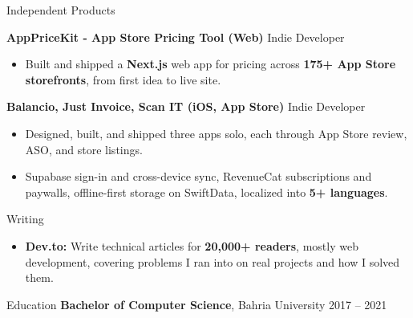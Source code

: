 \documentclass{resume}
\begin{document}
\begin{rSection}{Independent Products}

\textbf{AppPriceKit - App Store Pricing Tool (Web)} \hfill Indie Developer
\begin{itemize}
\itemsep 1pt {}
\item Built and shipped a \textbf{Next.js} web app for pricing across \textbf{175+ App Store storefronts}, from first idea to live site.
\end{itemize}

\textbf{Balancio, Just Invoice, Scan IT (iOS, App Store)} \hfill Indie Developer
\begin{itemize}
\itemsep 1pt {}
\item Designed, built, and shipped three apps solo, each through App Store review, ASO, and store listings.
\item Supabase sign-in and cross-device sync, RevenueCat subscriptions and paywalls, offline-first storage on SwiftData, localized into \textbf{5+ languages}.
\end{itemize}

\end{rSection}

\begin{rSection}{Writing}
\begin{itemize}
\itemsep 1pt {}
\item \textbf{Dev.to:} Write technical articles for \textbf{20,000+ readers}, mostly web development, covering problems I ran into on real projects and how I solved them.
\end{itemize}
\end{rSection}

\begin{rSection}{Education}
{\bf Bachelor of Computer Science}, Bahria University \hfill {2017 -- 2021}
\end{rSection}
\end{document}
